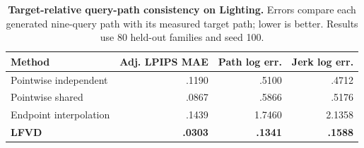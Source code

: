 \begin{table}[t]
\centering
\caption{\textbf{Target-relative query-path consistency on Lighting.}
Errors compare each generated nine-query path with its measured target path;
lower is better. Results use 80 held-out families and seed 100.}
\label{tab:query_path}
\scriptsize
\setlength{\tabcolsep}{2.6pt}
\begin{tabular*}{\linewidth}{@{\extracolsep{\fill}}lrrr@{}}
\toprule
Method & Adj. LPIPS MAE & Path log err. & Jerk log err. \\
\midrule
Pointwise independent & .1190 & .5100 & .4712 \\
Pointwise shared      & .0867 & .5866 & .5176 \\
Endpoint interpolation & .1439 & 1.7460 & 2.1358 \\
\textbf{LFVD} & \textbf{.0303} & \textbf{.1341} & \textbf{.1588} \\
\bottomrule
\end{tabular*}
\end{table}
